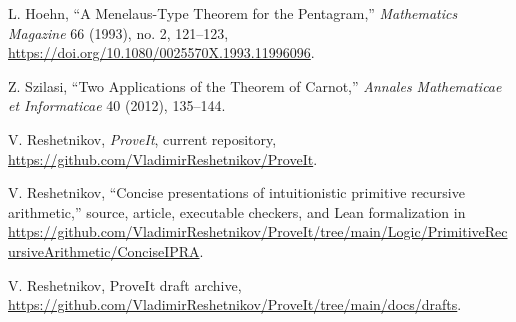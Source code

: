 \begin{enumerate}[label={[\arabic*]}]
\item L. Hoehn, ``A Menelaus-Type Theorem for the Pentagram,''
\emph{Mathematics Magazine} 66 (1993), no. 2, 121--123,
\url{https://doi.org/10.1080/0025570X.1993.11996096}.

\item Z. Szilasi, ``Two Applications of the Theorem of Carnot,''
\emph{Annales Mathematicae et Informaticae} 40 (2012), 135--144.

\item V. Reshetnikov, \emph{ProveIt}, current repository,
\url{https://github.com/VladimirReshetnikov/ProveIt}.

\item V. Reshetnikov, ``Concise presentations of intuitionistic primitive
recursive arithmetic,'' source, article, executable checkers, and Lean
formalization in
\url{https://github.com/VladimirReshetnikov/ProveIt/tree/main/Logic/PrimitiveRecursiveArithmetic/ConciseIPRA}.

\item V. Reshetnikov, ProveIt draft archive,
\url{https://github.com/VladimirReshetnikov/ProveIt/tree/main/docs/drafts}.
\end{enumerate}
